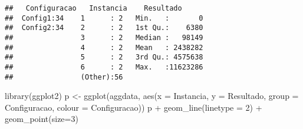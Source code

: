 \documentclass[
]{article}
\newenvironment{Shaded}{\begin{snugshade}}{\end{snugshade}}
\newcommand{\AttributeTok}[1]{\textcolor[rgb]{0.77,0.63,0.00}{#1}}
\newcommand{\ConstantTok}[1]{\textcolor[rgb]{0.00,0.00,0.00}{#1}}
\newcommand{\ControlFlowTok}[1]{\textcolor[rgb]{0.13,0.29,0.53}{\textbf{#1}}}
\newcommand{\DecValTok}[1]{\textcolor[rgb]{0.00,0.00,0.81}{#1}}
\newcommand{\FunctionTok}[1]{\textcolor[rgb]{0.00,0.00,0.00}{#1}}
\newcommand{\NormalTok}[1]{#1}
\newcommand{\OtherTok}[1]{\textcolor[rgb]{0.56,0.35,0.01}{#1}}
\newcommand{\SpecialCharTok}[1]{\textcolor[rgb]{0.00,0.00,0.00}{#1}}
\newcommand{\StringTok}[1]{\textcolor[rgb]{0.31,0.60,0.02}{#1}}
\begin{document}
\begin{Shaded}
\end{Shaded}

\begin{verbatim}
##   Configuracao   Instancia    Resultado       
##  Config1:34    1      : 2   Min.   :       0  
##  Config2:34    2      : 2   1st Qu.:    6380  
##                3      : 2   Median :   98149  
##                4      : 2   Mean   : 2438282  
##                5      : 2   3rd Qu.: 4575638  
##                6      : 2   Max.   :11623286  
##                (Other):56
\end{verbatim}

\begin{Shaded}
\begin{Highlighting}[]
\FunctionTok{library}\NormalTok{(ggplot2)}
\NormalTok{p }\OtherTok{\textless{}{-}} \FunctionTok{ggplot}\NormalTok{(aggdata, }\FunctionTok{aes}\NormalTok{(}\AttributeTok{x =}\NormalTok{ Instancia, }
                         \AttributeTok{y =}\NormalTok{ Resultado, }
                         \AttributeTok{group =}\NormalTok{ Configuracao, }
                         \AttributeTok{colour =}\NormalTok{ Configuracao))}
\NormalTok{p }\SpecialCharTok{+} \FunctionTok{geom\_line}\NormalTok{(}\AttributeTok{linetype =} \DecValTok{2}\NormalTok{) }\SpecialCharTok{+} \FunctionTok{geom\_point}\NormalTok{(}\AttributeTok{size=}\DecValTok{3}\NormalTok{)}
\end{Highlighting}
\end{Shaded}
\end{document}

